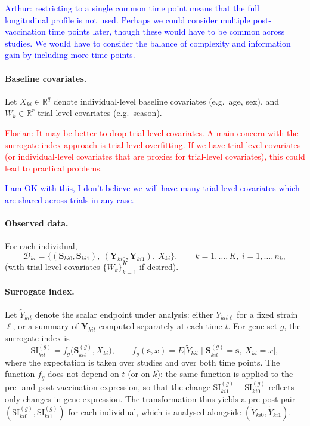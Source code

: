 \documentclass{article}
\begin{document}
\textcolor{blue}{Arthur: restricting to a single common time point means that the full longitudinal profile is not used. Perhaps we could consider multiple post-vaccination time points later, though these would have to be common across studies. We would have to consider the balance of complexity and information gain by including more time points.}

\paragraph{Baseline covariates.} Let $X_{ki} \in \mathbb{R}^q$ denote individual-level baseline covariates (e.g.\ age, sex), and $W_k \in \mathbb{R}^r$ trial-level covariates (e.g.\ season).

\textcolor{red}{Florian: It may be better to drop trial-level covariates. A main concern with the surrogate-index approach is trial-level overfitting. If we have trial-level covariates (or individual-level covariates that are proxies for trial-level covariates), this could lead to practical problems. }

\textcolor{blue}{I am OK with this, I don't believe we will have many trial-level covariates which are shared across trials in any case.}

\paragraph{Observed data.} For each individual,
\[
\mathcal{D}_{ki} = \big\{ (\boldsymbol{S}_{ki0}, \boldsymbol{S}_{ki1}),\ (\boldsymbol{Y}_{ki0}, \boldsymbol{Y}_{ki1}),\ X_{ki} \big\},\qquad k = 1,\dots,K,\ i = 1,\dots,n_k,
\]
(with trial-level covariates $\{W_k\}_{k=1}^K$ if desired).

\paragraph{Surrogate index.} Let $\tilde{Y}_{kit}$ denote the scalar endpoint under analysis: either $Y_{kit\ell}$ for a fixed strain $\ell$, or a summary of $\boldsymbol{Y}_{kit}$ computed separately at each time $t$. For gene set $g$, the surrogate index is
\[
\mathrm{SI}^{(g)}_{kit} = f_g\big(\boldsymbol{S}_{kit}^{(g)}, X_{ki}\big), \qquad f_g(\boldsymbol{s}, x) = E\big[\tilde{Y}_{kit} \mid \boldsymbol{S}_{kit}^{(g)} = \boldsymbol{s},\ X_{ki} = x\big],
\]
where the expectation is taken over studies and over both time points. The function $f_g$ does not depend on $t$ (or on $k$): the same function is applied to the pre- and post-vaccination expression, so that the change $\mathrm{SI}^{(g)}_{ki1} - \mathrm{SI}^{(g)}_{ki0}$ reflects only changes in gene expression. The transformation thus yields a pre-post pair $(\mathrm{SI}^{(g)}_{ki0}, \mathrm{SI}^{(g)}_{ki1})$ for each individual, which is analysed alongside $(\tilde{Y}_{ki0}, \tilde{Y}_{ki1})$.
\end{document}
